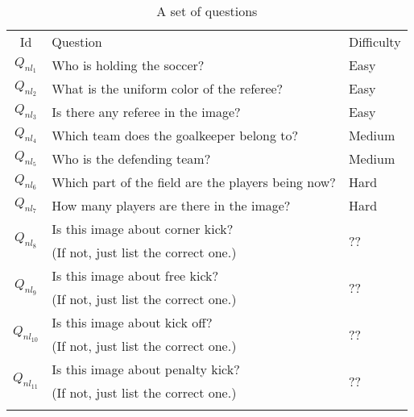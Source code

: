 \begin{table}[thb]
	\renewcommand{\arraystretch}{1}
	\begin{center}
		\footnotesize		
		\begin{tabular}{c|*{2}{l}}
			\Xhline{1pt}
			Id & Question                                           & Difficulty \\ \Xhline{0.7pt}
			$Q_{nl_1}$  & Who is holding the soccer?                         & Easy       \\ %
			$Q_{nl_2}$  & What is the uniform color of the referee?           & Easy       \\ %
			$Q_{nl_3}$  & Is there any referee in the image?                 & Easy       \\ \hline
			$Q_{nl_4}$  & Which team does the goalkeeper belong to?          & Medium       \\ \hline
			$Q_{nl_5}$  & Who is the defending team?                         & Medium       \\ \hline
			$Q_{nl_6}$  & Which part of the field are the players being now? & Hard       \\ \hline
			$Q_{nl_7}$  & How many players are there in the image?           & Hard     \\ \hline
			
			\multirow{2}{*}{$Q_{nl_8}$ }
			& Is this image about corner kick?           &  \multirow{2}{*}{\color{red}??}  \\ 
			& {\color{red}(If not, just list the correct one.)}  & \\ \hline
			
			\multirow{2}{*}{$Q_{nl_{9}}$}  &  Is this image about free kick?  &  \multirow{2}{*}{\color{red}??}    \\ 
			& {\color{red}(If not, just list the correct one.)}  &  \\ \hline
			
			\multirow{2}{*}{$Q_{nl_{10}}$}  &  Is this image about kick off?  &  \multirow{2}{*}{\color{red}??}    \\ 
			& {\color{red}(If not, just list the correct one.)}  &  \\ \hline
			
			\multirow{2}{*}{$Q_{nl_{11}}$}  &   Is this image about penalty kick?  &  \multirow{2}{*}{\color{red}??}    \\ 
			& {\color{red}(If not, just list the correct one.)}  &  \\ %
			
			\Xhline{1pt}
		\end{tabular}
		\caption{A set of questions}
		\label{table:questions}
	\end{center}
\end{table}


